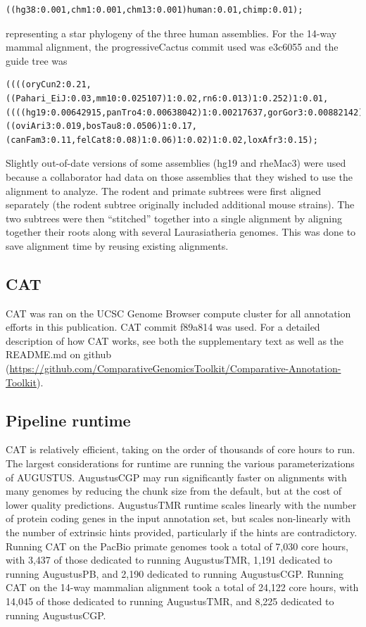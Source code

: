 \documentclass[fleqn,10pt]{wlscirep}
\begin{document}
\begin{lstlisting}
((hg38:0.001,chm1:0.001,chm13:0.001)human:0.01,chimp:0.01);
\end{lstlisting}
    
representing a star phylogeny of the three human assemblies. For the 14-way mammal alignment, the progressiveCactus commit used was e3c6055 and the guide tree was 
    
\begin{lstlisting}
((((oryCun2:0.21,((Pahari_EiJ:0.03,mm10:0.025107)1:0.02,rn6:0.013)1:0.252)1:0.01,((((hg19:0.00642915,panTro4:0.00638042)1:0.00217637,gorGor3:0.00882142)1:0.00935116,ponAbe2:0.0185056)1:0.00440069,rheMac3:0.007)1:0.1)1:0.02,((oviAri3:0.019,bosTau8:0.0506)1:0.17,(canFam3:0.11,felCat8:0.08)1:0.06)1:0.02)1:0.02,loxAfr3:0.15);
\end{lstlisting}
    
    
Slightly out-of-date versions of some assemblies (hg19 and rheMac3) were used because a collaborator had data on those assemblies that they wished to use the alignment to analyze. The rodent and primate subtrees were first aligned separately (the rodent subtree originally included additional mouse strains). The two subtrees were then “stitched” together into a single alignment by aligning together their roots along with several Laurasiatheria genomes. This was done to save alignment time by reusing existing alignments.

\subsection*{CAT}
CAT was ran on the UCSC Genome Browser compute cluster for all annotation efforts in this publication. CAT commit f89a814 was used. For a detailed description of how CAT works, see both the supplementary text as well as the README.md on github (\url{https://github.com/ComparativeGenomicsToolkit/Comparative-Annotation-Toolkit}). 

\subsection*{Pipeline runtime}
CAT is relatively efficient, taking on the order of thousands of core hours to run. The largest considerations for runtime are running the various parameterizations of AUGUSTUS. AugustusCGP may run significantly faster on alignments with many genomes by reducing the chunk size from the default, but at the cost of lower quality predictions. AugustusTMR runtime scales linearly with the number of protein coding genes in the input annotation set, but scales non-linearly with the number of extrinsic hints provided, particularly if the hints are contradictory. 
Running CAT on the PacBio primate genomes took a total of 7,030 core hours, with 3,437 of those dedicated to running AugustusTMR, 1,191 dedicated to running AugustusPB, and 2,190 dedicated to running AugustusCGP. Running CAT on the 14-way mammalian alignment took a total of 24,122 core hours, with 14,045 of those dedicated to running AugustusTMR, and 8,225 dedicated to running AugustusCGP.
\end{document}
